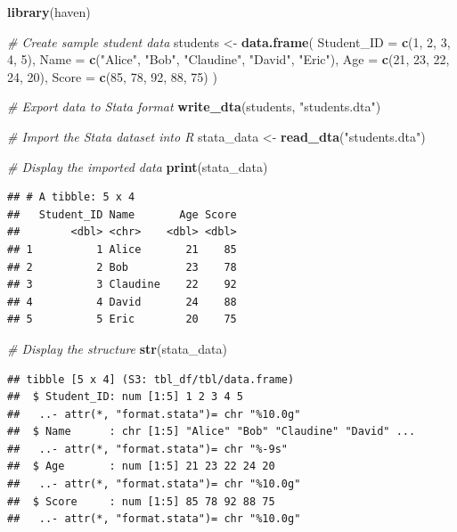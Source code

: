 \documentclass[
]{article}
\newenvironment{Shaded}{\begin{snugshade}}{\end{snugshade}}
\newcommand{\AttributeTok}[1]{\textcolor[rgb]{0.13,0.29,0.53}{#1}}
\newcommand{\CommentTok}[1]{\textcolor[rgb]{0.56,0.35,0.01}{\textit{#1}}}
\newcommand{\DecValTok}[1]{\textcolor[rgb]{0.00,0.00,0.81}{#1}}
\newcommand{\FunctionTok}[1]{\textcolor[rgb]{0.13,0.29,0.53}{\textbf{#1}}}
\newcommand{\NormalTok}[1]{#1}
\newcommand{\OtherTok}[1]{\textcolor[rgb]{0.56,0.35,0.01}{#1}}
\newcommand{\StringTok}[1]{\textcolor[rgb]{0.31,0.60,0.02}{#1}}
\begin{document}
\begin{Shaded}
\begin{Highlighting}[]
\FunctionTok{library}\NormalTok{(haven)}

\CommentTok{\# Create sample student data}
\NormalTok{students }\OtherTok{\textless{}{-}} \FunctionTok{data.frame}\NormalTok{(}
  \AttributeTok{Student\_ID =} \FunctionTok{c}\NormalTok{(}\DecValTok{1}\NormalTok{, }\DecValTok{2}\NormalTok{, }\DecValTok{3}\NormalTok{, }\DecValTok{4}\NormalTok{, }\DecValTok{5}\NormalTok{),}
  \AttributeTok{Name =} \FunctionTok{c}\NormalTok{(}\StringTok{"Alice"}\NormalTok{, }\StringTok{"Bob"}\NormalTok{, }\StringTok{"Claudine"}\NormalTok{, }\StringTok{"David"}\NormalTok{, }\StringTok{"Eric"}\NormalTok{),}
  \AttributeTok{Age =} \FunctionTok{c}\NormalTok{(}\DecValTok{21}\NormalTok{, }\DecValTok{23}\NormalTok{, }\DecValTok{22}\NormalTok{, }\DecValTok{24}\NormalTok{, }\DecValTok{20}\NormalTok{),}
  \AttributeTok{Score =} \FunctionTok{c}\NormalTok{(}\DecValTok{85}\NormalTok{, }\DecValTok{78}\NormalTok{, }\DecValTok{92}\NormalTok{, }\DecValTok{88}\NormalTok{, }\DecValTok{75}\NormalTok{)}
\NormalTok{)}

\CommentTok{\# Export data to Stata format}
\FunctionTok{write\_dta}\NormalTok{(students, }\StringTok{"students.dta"}\NormalTok{)}

\CommentTok{\# Import the Stata dataset into R}
\NormalTok{stata\_data }\OtherTok{\textless{}{-}} \FunctionTok{read\_dta}\NormalTok{(}\StringTok{"students.dta"}\NormalTok{)}

\CommentTok{\# Display the imported data}
\FunctionTok{print}\NormalTok{(stata\_data)}
\end{Highlighting}
\end{Shaded}

\begin{verbatim}
## # A tibble: 5 x 4
##   Student_ID Name       Age Score
##        <dbl> <chr>    <dbl> <dbl>
## 1          1 Alice       21    85
## 2          2 Bob         23    78
## 3          3 Claudine    22    92
## 4          4 David       24    88
## 5          5 Eric        20    75
\end{verbatim}

\begin{Shaded}
\begin{Highlighting}[]
\CommentTok{\# Display the structure}
\FunctionTok{str}\NormalTok{(stata\_data)}
\end{Highlighting}
\end{Shaded}

\begin{verbatim}
## tibble [5 x 4] (S3: tbl_df/tbl/data.frame)
##  $ Student_ID: num [1:5] 1 2 3 4 5
##   ..- attr(*, "format.stata")= chr "%10.0g"
##  $ Name      : chr [1:5] "Alice" "Bob" "Claudine" "David" ...
##   ..- attr(*, "format.stata")= chr "%-9s"
##  $ Age       : num [1:5] 21 23 22 24 20
##   ..- attr(*, "format.stata")= chr "%10.0g"
##  $ Score     : num [1:5] 85 78 92 88 75
##   ..- attr(*, "format.stata")= chr "%10.0g"
\end{verbatim}
\end{document}
